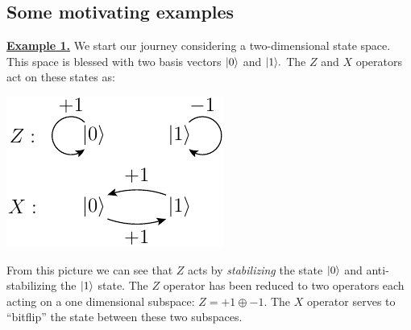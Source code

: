 
\subsection{Some motivating examples}

\underline{\bf Example 1.}
We start our journey considering a two-dimensional state space.
This space is blessed with two basis vectors $|{0}\rangle$ and $|{1}\rangle.$
The $Z$ and $X$ operators act on these states as:
\begin{center}
\includegraphics[]{pic-zx.pdf}
\end{center}
From this picture we can see that $Z$ acts by \emph{stabilizing} the
state $|{0}\rangle$ and anti-stabilizing the $|{1}\rangle$ state.
The $Z$ operator has been reduced 
to two operators each acting on a one dimensional subspace:
$Z = +1 \oplus -1.$
The $X$ operator serves to ``bitflip'' the state between
these two subspaces.

